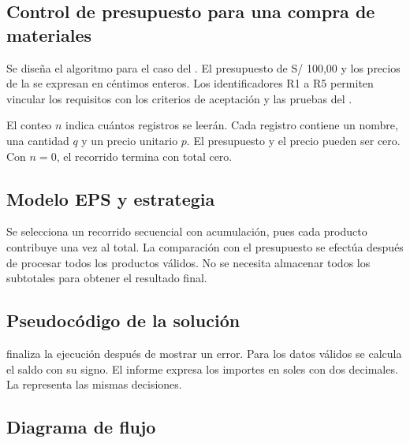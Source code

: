 
\subsection{Control de presupuesto para una compra de materiales}

Se diseña el algoritmo para el caso del . El presupuesto de S/ 100,00 y los precios de la  se expresan en céntimos enteros. Los identificadores R1 a R5 permiten vincular los requisitos con los criterios de aceptación y las pruebas del .



El conteo \(n\) indica cuántos registros se leerán. Cada registro contiene un nombre, una cantidad \(q\) y un precio unitario \(p\). El presupuesto y el precio pueden ser cero. Con \(n=0\), el recorrido termina con total cero.

\subsection{Modelo EPS y estrategia}



Se selecciona un recorrido secuencial con acumulación, pues cada producto contribuye una vez al total. La comparación con el presupuesto se efectúa después de procesar todos los productos válidos. No se necesita almacenar todos los subtotales para obtener el resultado final.

\subsection{Pseudocódigo de la solución}


 finaliza la ejecución después de mostrar un error. Para los datos válidos se calcula el saldo con su signo. El informe expresa los importes en soles con dos decimales. La  representa las mismas decisiones.

\subsection{Diagrama de flujo}

